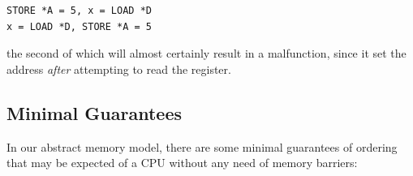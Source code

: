 \vspace{5pt}
\begin{minipage}[t]{\columnwidth}
\scriptsize
\begin{verbatim}
STORE *A = 5, x = LOAD *D
x = LOAD *D, STORE *A = 5
\end{verbatim}
\vspace{1pt}
\end{minipage}
%
the second of which will almost certainly result in a malfunction, since it set
the address \emph{after} attempting to read the register.

\subsection{Minimal Guarantees}
\label{sec:advsync:Minimal Guarantees}

In our abstract memory model, there are some minimal guarantees of ordering
that may be expected of a CPU without any need of memory barriers:

